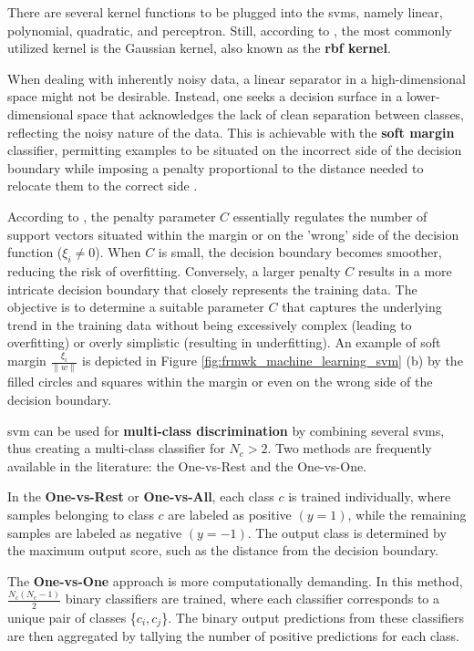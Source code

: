 There are several kernel functions to be plugged into the \gls{svm}s, namely linear, polynomial, quadratic, and perceptron. Still, according to \textcite{Goodfellow2016}, the most commonly utilized kernel is the Gaussian kernel, also known as the \textbf{\gls{rbf} kernel}.

When dealing with inherently noisy data, a linear separator in a high-dimensional space might not be desirable. Instead, one seeks a decision surface in a lower-dimensional space that acknowledges the lack of clean separation between classes, reflecting the noisy nature of the data. This is achievable with the \textbf{soft margin} classifier, permitting examples to be situated on the incorrect side of the decision boundary while imposing a penalty proportional to the distance needed to relocate them to the correct side \cite{Russel2010}.

According to \textcite{Rothmund2018}, the penalty parameter $C$ essentially regulates the number of support vectors situated within the margin or on the 'wrong' side of the decision function ($\xi_i \neq 0$). When $C$ is small, the decision boundary becomes smoother, reducing the risk of overfitting. Conversely, a larger penalty $C$ results in a more intricate decision boundary that closely represents the training data. The objective is to determine a suitable parameter $C$ that captures the underlying trend in the training data without being excessively complex (leading to overfitting) or overly simplistic (resulting in underfitting). An example of soft margin $\frac{\xi_i}{\parallel w \parallel}$ is depicted in Figure \ref{fig:frmwk_machine_learning_svm} (b) by the filled circles and squares within the margin or even on the wrong side of the decision boundary.

\gls{svm} can be used for \textbf{multi-class discrimination} by combining several \gls{svm}s, thus creating a multi-class classifier for $N_c > 2$. Two methods are frequently available in the literature: the One-vs-Rest and the One-vs-One.

In the \textbf{One-vs-Rest} or \textbf{One-vs-All}, each class $c$ is trained individually, where samples belonging to class $c$ are labeled as positive $(y = 1)$, while the remaining samples are labeled as negative $(y = -1)$. The output class is determined by the maximum output score, such as the distance from the decision boundary.

The \textbf{One-vs-One} approach is more computationally demanding. In this method, $\frac{N_c(N_c-1)}{2}$ binary classifiers are trained, where each classifier corresponds to a unique pair of classes \{$c_i, c_j$\}. The binary output predictions from these classifiers are then aggregated by tallying the number of positive predictions for each class.

